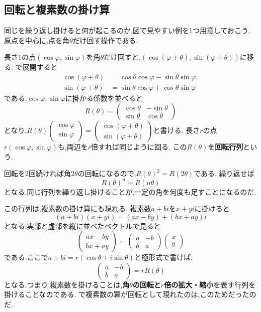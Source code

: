 \subsection{回転と複素数の掛け算}\label{節：回転と複素数の掛け算}

同じを繰り返し掛けると何が起こるのか,図で見やすい例を1つ用意しておこう.
原点を中心に,点を角$\theta$だけ回す操作である.

長さ1の点$(\cos\varphi,\sin\varphi)$を角$\theta$だけ回すと,$(\cos(\varphi+\theta),\sin(\varphi+\theta))$に移る.
で展開すると
\[
  \begin{aligned}
    \cos(\varphi+\theta)&=\cos\theta\cos\varphi-\sin\theta\sin\varphi,\\
    \sin(\varphi+\theta)&=\sin\theta\cos\varphi+\cos\theta\sin\varphi
  \end{aligned}
\]
である.$\cos\varphi,\sin\varphi$に掛かる係数を並べると
\[
  R(\theta)=\begin{pmatrix}\cos\theta&-\sin\theta\\\sin\theta&\cos\theta\end{pmatrix}
\]
となり,$R(\theta)\begin{pmatrix}\cos\varphi\\\sin\varphi\end{pmatrix}=\begin{pmatrix}\cos(\varphi+\theta)\\\sin(\varphi+\theta)\end{pmatrix}$と書ける.
長さ$r$の点$r(\cos\varphi,\sin\varphi)$も,両辺を$r$倍すれば同じように回る.
この$R(\theta)$を\textbf{回転行列}という.

回転を2回続ければ角$2\theta$の回転になるので,$R(\theta)^2=R(2\theta)$である.
繰り返せば
\[
  R(\theta)^n=R(n\theta)
\]
となる.同じ行列を繰り返し掛けることが,一定の角を何度も足すことになるのだ.

この行列は,複素数の掛け算にも現れる.
複素数$a+bi$を$x+yi$に掛けると
\[
  (a+bi)(x+yi)=(ax-by)+(bx+ay)i
\]
となる.実部と虚部を縦に並べたベクトルで見ると
\[
  \begin{pmatrix}ax-by\\bx+ay\end{pmatrix}
  =\begin{pmatrix}a&-b\\b&a\end{pmatrix}\begin{pmatrix}x\\y\end{pmatrix}
\]
である.ここで$a+bi=r(\cos\theta+i\sin\theta)$と極形式で書けば,
\[
  \begin{pmatrix}a&-b\\b&a\end{pmatrix}=rR(\theta)
\]
となる.つまり,複素数を掛けることは,\textbf{角$\theta$の回転と$r$倍の拡大・縮小}を表す行列を掛けることなのである.
で複素数の冪が回転として現れたのは,このためだったのだ.

